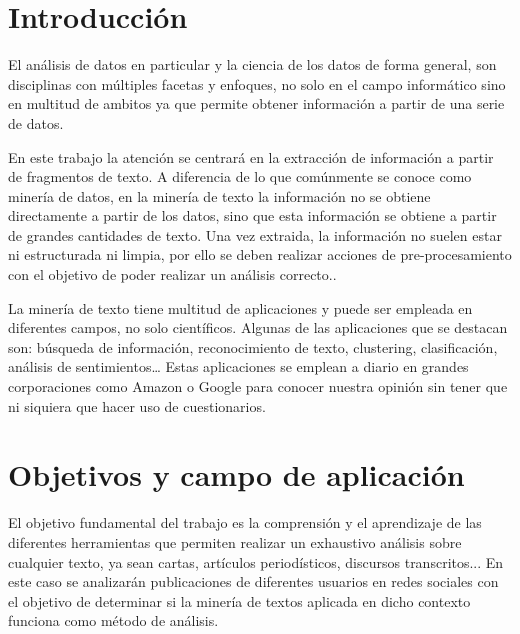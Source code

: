 
\section{Introducción}
\label{sec:introduccion}

El análisis de datos en particular y la ciencia de los datos de forma general, son  disciplinas con múltiples 
facetas y enfoques, no solo en el campo informático sino en multitud de ambitos ya que permite 
obtener información a partir de una serie de datos.

En este trabajo la atención se centrará en la extracción de información a partir de fragmentos de texto.
A diferencia de lo que comúnmente se conoce como minería de datos, en la minería de texto la información 
no se obtiene directamente a partir de los datos, sino que esta información se obtiene a partir de grandes 
cantidades de texto. Una vez extraida, la información no suelen estar ni estructurada ni limpia, por ello se deben 
realizar acciones de pre-procesamiento con el objetivo de poder realizar un análisis correcto.\cite{datavstextmining}.

La minería de texto tiene multitud de aplicaciones y puede ser empleada en diferentes 
campos, no solo científicos. Algunas de las aplicaciones que se destacan son: búsqueda de 
información, reconocimiento de texto, clustering, clasificación, análisis de sentimientos… Estas 
aplicaciones se emplean a diario en grandes corporaciones como Amazon o Google para conocer nuestra 
opinión sin tener que ni siquiera que hacer uso de cuestionarios.


\section{Objetivos y campo de aplicación}
\label{sec:objetivos-y-campo}

El objetivo fundamental del trabajo es la comprensión y el aprendizaje de las diferentes
herramientas que permiten realizar un exhaustivo análisis sobre cualquier texto, ya sean cartas, 
artículos periodísticos, discursos transcritos... En este caso se analizarán publicaciones de diferentes 
usuarios en redes sociales con el objetivo de determinar si la minería de textos aplicada en dicho contexto 
funciona como método de análisis.

